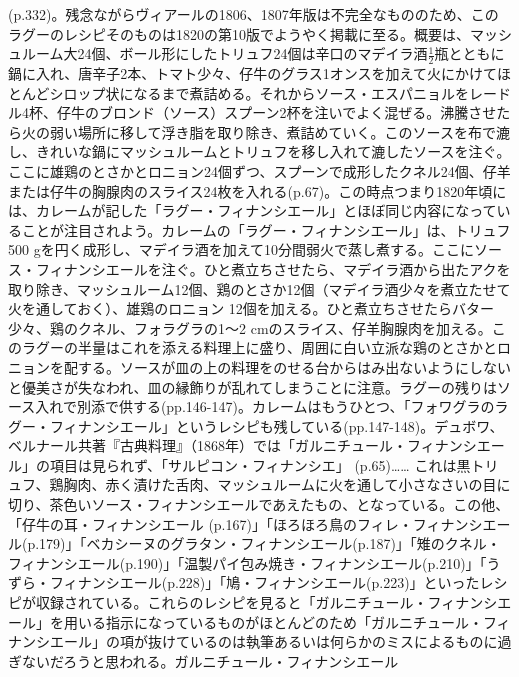 \begin{recette}
{{{{  (p.332)。残念ながらヴィアールの1806、1807年版は不完全なもののため、このラグーのレシピそのものは1820の第10版でようやく掲載に至る。概要は、マッシュルーム大24個、ボール形にしたトリュフ24個は辛口のマデイラ酒\(\frac{1}{2}\)瓶とともに鍋に入れ、唐辛子2本、トマト少々、仔牛のグラス1オンスを加えて火にかけてほとんどシロップ状になるまで煮詰める。それからソース・エスパニョルをレードル4杯、仔牛のブロンド（ソース）スプーン2杯を注いでよく混ぜる。沸騰させたら火の弱い場所に移して浮き脂を取り除き、煮詰めていく。このソースを布で漉し、きれいな鍋にマッシュルームとトリュフを移し入れて漉したソースを注ぐ。ここに雄鶏のとさかとロニョン24個ずつ、スプーンで成形したクネル24個、仔羊または仔牛の胸腺肉のスライス24枚を入れる(p.67)。この時点つまり1820年頃には、カレームが記した「ラグー・フィナンシエール」とほぼ同じ内容になっていることが注目されよう。カレームの「ラグー・フィナンシエール」は、トリュフ500
  gを円く成形し、マデイラ酒を加えて10分間弱火で蒸し煮する。ここにソース・フィナンシエールを注ぐ。ひと煮立ちさせたら、マデイラ酒から出たアクを取り除き、マッシュルーム12個、鶏のとさか12個（マデイラ酒少々を煮立たせて火を通しておく）、雄鶏のロニョン
  12個を加える。ひと煮立ちさせたらバター少々、鶏のクネル、フォラグラの1〜2
  cmのスライス、仔羊胸腺肉を加える。このラグーの半量はこれを添える料理上に盛り、周囲に白い立派な鶏のとさかとロニョンを配する。ソースが皿の上の料理をのせる台からはみ出ないようにしないと優美さが失なわれ、皿の縁飾りが乱れてしまうことに注意。ラグーの残りはソース入れで別添で供する(pp.146-147)。カレームはもうひとつ、「フォワグラのラグー・フィナンシエール」というレシピも残している(pp.147-148)。デュボワ、ベルナール共著『古典料理』（1868年）では「ガルニチュール・フィナンシエール」の項目は見られず、「サルピコン・フィナンシエ」
  (p.65)\ldots{}\ldots{}
  これは黒トリュフ、鶏胸肉、赤く漬けた舌肉、マッシュルームに火を通して小さなさいの目に切り、茶色いソース・フィナンシエールであえたもの、となっている。この他、「仔牛の耳・フィナンシエール
  (p.167)」「ほろほろ鳥のフィレ・フィナンシエール(p.179)」「ベカシーヌのグラタン・フィナンシエール(p.187)」「雉のクネル・フィナンシエール(p.190)」「温製パイ包み焼き・フィナンシエール(p.210)」「うずら・フィナンシエール(p.228)」「鳩・フィナンシエール(p.223)」といったレシピが収録されている。これらのレシピを見ると「ガルニチュール・フィナンシエール」を用いる指示になっているものがほとんどのため「ガルニチュール・フィナンシエール」の項が抜けているのは執筆あるいは何らかのミスによるものに過ぎないだろうと思われる。}}{ガルニチュール・フィナンシエール}}\label{garniture-a-la-financiere}}



\end{recette}
